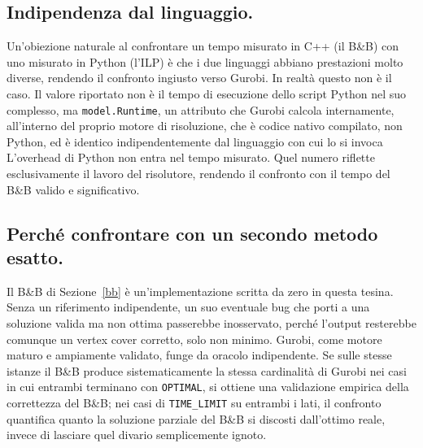 \subsection{Indipendenza dal linguaggio.} 
Un'obiezione naturale al confrontare un tempo misurato in C++ (il B\&B) con uno misurato in Python (l'ILP) è che i due linguaggi abbiano prestazioni molto diverse, 
rendendo il confronto ingiusto verso Gurobi. 
In realtà questo non è il caso. Il valore riportato non è il tempo di esecuzione dello script Python 
nel suo complesso, ma \texttt{model.Runtime}, un attributo che Gurobi calcola internamente, 
all'interno del proprio motore di risoluzione, che è codice nativo compilato, non Python, ed è identico indipendentemente dal linguaggio con cui lo si invoca 
L'overhead di Python non entra nel tempo misurato. Quel numero riflette esclusivamente il lavoro del risolutore, rendendo il confronto con il tempo del B\&B valido e significativo.

\subsection{Perché confrontare con un secondo metodo esatto.} 

Il B\&B di Sezione~\ref{bb} è un'implementazione scritta da zero in questa tesina. 
Senza un riferimento indipendente, un suo eventuale bug che porti a una soluzione valida ma non ottima passerebbe inosservato, 
perché l'output resterebbe comunque un vertex cover corretto, solo non minimo. 
Gurobi, come motore maturo e ampiamente validato, funge da oracolo indipendente. 
Se sulle stesse istanze il B\&B produce sistematicamente la stessa cardinalità di Gurobi nei casi in cui entrambi terminano con \texttt{OPTIMAL}, 
si ottiene una validazione empirica della correttezza del B\&B; nei casi di \texttt{TIME\_LIMIT} su entrambi i lati, il confronto quantifica quanto la soluzione parziale del B\&B si discosti dall'ottimo reale, invece di lasciare quel divario semplicemente ignoto.
